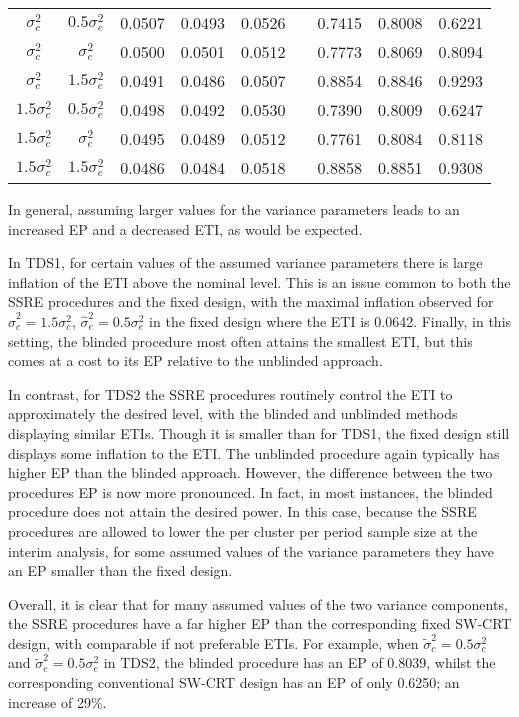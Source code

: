 \documentclass{article}
\begin{document}
\begin{table}[htb]
\begin{center}
\begin{tabular}{ccccccccc}
			$\sigma_c^2$ & $0.5\sigma_e^2$ & 0.0507 & 0.0493 & 0.0526 && 0.7415 & 0.8008 & 0.6221 \\
			$\sigma_c^2$ & $\sigma_e^2$ & 0.0500 & 0.0501 & 0.0512 && 0.7773 & 0.8069 & 0.8094 \\
			$\sigma_c^2$ & $1.5\sigma_e^2$ & 0.0491 & 0.0486 & 0.0507 && 0.8854 & 0.8846 & 0.9293 \\
			$1.5\sigma_c^2$ & $0.5\sigma_e^2$ & 0.0498 & 0.0492 & 0.0530 && 0.7390 & 0.8009 & 0.6247 \\
			$1.5\sigma_c^2$ & $\sigma_e^2$ & 0.0495 & 0.0489 & 0.0512 && 0.7761 & 0.8084 & 0.8118 \\
			$1.5\sigma_c^2$ & $1.5\sigma_e^2$ & 0.0486 & 0.0484 & 0.0518 && 0.8858 & 0.8851 & 0.9308 \\
			\hline
		\end{tabular}
	\end{center}
\end{table}

In general, assuming larger values for the variance parameters leads to an increased EP and a decreased ETI, as would be expected.

In TDS1, for certain values of the assumed variance parameters there is large inflation of the ETI above the nominal level. This is an issue common to both the SSRE procedures and the fixed design, with the maximal inflation observed for $\hat{\sigma}_c^2=1.5\sigma_c^2$, $\hat{\sigma}_e^2=0.5\sigma_e^2$ in the fixed design where the ETI is 0.0642. Finally, in this setting, the blinded procedure most often attains the smallest ETI, but this comes at a cost to its EP relative to the unblinded approach.

In contrast, for TDS2 the SSRE procedures routinely control the ETI to approximately the desired level, with the blinded and unblinded methods displaying similar ETIs. Though it is smaller than for TDS1, the fixed design still displays some inflation to the ETI. The unblinded procedure again typically has higher EP than the blinded approach. However, the difference between the two procedures EP is now more pronounced. In fact, in most instances, the blinded procedure does not attain the desired power. In this case, because the SSRE procedures are allowed to lower the per cluster per period sample size at the interim analysis, for some assumed values of the variance parameters they have an EP smaller than the fixed design.

Overall, it is clear that for many assumed values of the two variance components, the SSRE procedures have a far higher EP than the corresponding fixed SW-CRT design, with comparable if not preferable ETIs. For example, when $\tilde{\sigma}_c^2=0.5\sigma_c^2$ and $\tilde{\sigma}_e^2=0.5\sigma_e^2$ in TDS2, the blinded procedure has an EP of 0.8039, whilst the corresponding conventional SW-CRT design has an EP of only 0.6250; an increase of 29\%. 
\end{document}

